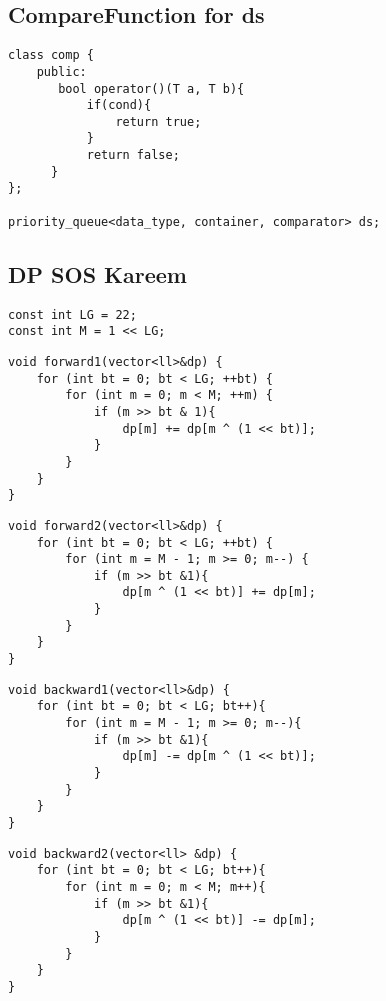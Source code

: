 {\subsection{CompareFunction for ds}

\begin{lstlisting}[style=cpp]
class comp {
    public:
       bool operator()(T a, T b){
           if(cond){
               return true;
           }
           return false;
      }
};

priority_queue<data_type, container, comparator> ds;
\end{lstlisting}

\subsection{DP SOS Kareem}

\begin{lstlisting}[style=cpp]
const int LG = 22;
const int M = 1 << LG;
\end{lstlisting}

\begin{lstlisting}[style=cpp]
void forward1(vector<ll>&dp) {
    for (int bt = 0; bt < LG; ++bt) {
        for (int m = 0; m < M; ++m) {
            if (m >> bt & 1){
                dp[m] += dp[m ^ (1 << bt)];
            }
        }
    }
}
\end{lstlisting}

\begin{lstlisting}[style=cpp]
void forward2(vector<ll>&dp) {
    for (int bt = 0; bt < LG; ++bt) {
        for (int m = M - 1; m >= 0; m--) {
            if (m >> bt &1){
                dp[m ^ (1 << bt)] += dp[m];
            }
        }
    }
}
\end{lstlisting}

\begin{lstlisting}[style=cpp]
void backward1(vector<ll>&dp) {
    for (int bt = 0; bt < LG; bt++){
        for (int m = M - 1; m >= 0; m--){
            if (m >> bt &1){
                dp[m] -= dp[m ^ (1 << bt)];
            }
        }
    }
}
\end{lstlisting}

\begin{lstlisting}[style=cpp]
void backward2(vector<ll> &dp) {
    for (int bt = 0; bt < LG; bt++){
        for (int m = 0; m < M; m++){
            if (m >> bt &1){
                dp[m ^ (1 << bt)] -= dp[m];
            }
        }
    }
}
\end{lstlisting}

}
